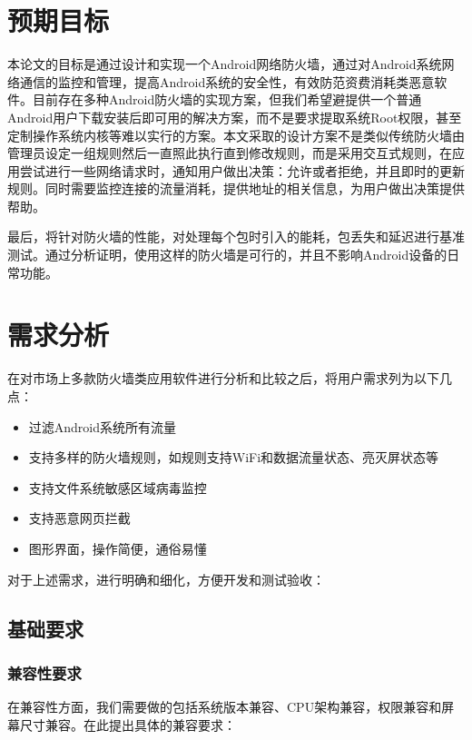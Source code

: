\documentclass[format=final, language=chinese, degree=fyp]{hustthesis}
\begin{document}
\section{预期目标}

本论文的目标是通过设计和实现一个Android网络防火墙，通过对Android系统网络通信的监控和管理，提高Android系统的安全性，有效防范资费消耗类恶意软件。目前存在多种Android防火墙的实现方案，但我们希望避提供一个普通Android用户下载安装后即可用的解决方案，而不是要求提取系统Root权限，甚至定制操作系统内核等难以实行的方案。本文采取的设计方案不是类似传统防火墙由管理员设定一组规则然后一直照此执行直到修改规则，而是采用交互式规则，在应用尝试进行一些网络请求时，通知用户做出决策：允许或者拒绝，并且即时的更新规则。同时需要监控连接的流量消耗，提供地址的相关信息，为用户做出决策提供帮助。


最后，将针对防火墙的性能，对处理每个包时引入的能耗，包丢失和延迟进行基准测试。通过分析证明，使用这样的防火墙是可行的，并且不影响Android设备的日常功能。

\section{需求分析}


在对市场上多款防火墙类应用软件进行分析和比较之后，将用户需求列为以下几点：
\begin{itemize}
	\item 过滤Android系统所有流量\label{item:1}
	\item 支持多样的防火墙规则，如规则支持WiFi和数据流量状态、亮灭屏状态等
	\item 支持文件系统敏感区域病毒监控
	\item 支持恶意网页拦截
	\item 图形界面，操作简便，通俗易懂
\end{itemize}

对于上述需求，进行明确和细化，方便开发和测试验收：
\subsection{基础要求}

\subsubsection{兼容性要求}
	在兼容性方面，我们需要做的包括系统版本兼容、CPU架构兼容，权限兼容和屏幕尺寸兼容。在此提出具体的兼容要求：
\end{document}
